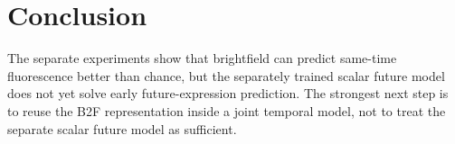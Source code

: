 \documentclass[11pt]{article}
\begin{document}
\section{Conclusion}

The separate experiments show that brightfield can predict same-time fluorescence better than chance, but the separately trained scalar future model does not yet solve early future-expression prediction. The strongest next step is to reuse the B2F representation inside a joint temporal model, not to treat the separate scalar future model as sufficient.
\end{document}
